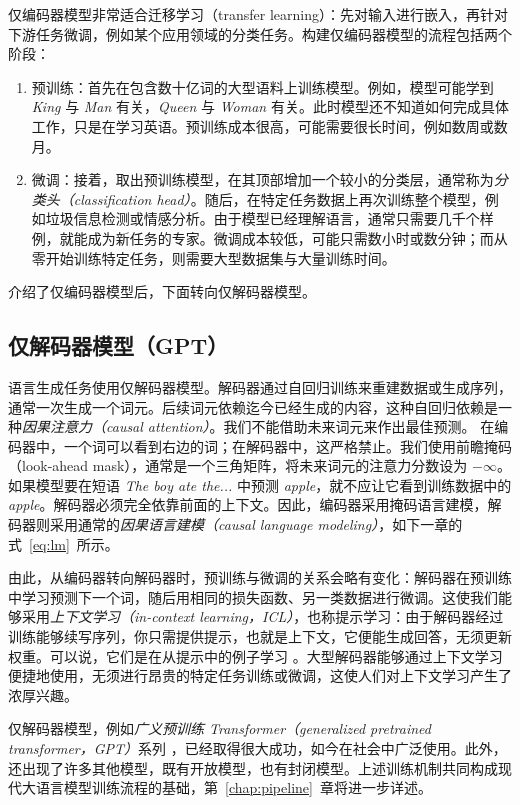 仅编码器模型非常适合迁移学习（transfer learning）：先对输入进行嵌入，再针对下游任务微调，例如某个应用领域的分类任务。构建仅编码器模型的流程包括两个阶段：
\begin{enumerate}
    \item 预训练：首先在包含数十亿词的大型语料上训练模型。例如，模型可能学到 \textit{King} 与 \textit{Man} 有关，\textit{Queen} 与 \textit{Woman} 有关。此时模型还不知道如何完成具体工作，只是在学习英语。预训练成本很高，可能需要很长时间，例如数周或数月。
    \item 微调：接着，取出预训练模型，在其顶部增加一个较小的分类层，通常称为\textit{分类头（classification head）}。随后，在特定任务数据上再次训练整个模型，例如垃圾信息检测或情感分析。由于模型已经理解语言，通常只需要几千个样例，就能成为新任务的专家。微调成本较低，可能只需数小时或数分钟；而从零开始训练特定任务，则需要大型数据集与大量训练时间。
\end{enumerate}
介绍了仅编码器模型后，下面转向仅解码器模型。

\subsection{仅解码器模型（GPT）}
语言生成任务使用仅解码器模型。解码器通过自回归训练来重建数据或生成序列，通常一次生成一个词元。后续词元依赖迄今已经生成的内容，这种自回归依赖是一种\textit{因果注意力（causal attention）}。我们不能借助未来词元来作出最佳预测。
在编码器中，一个词可以看到右边的词；在解码器中，这严格禁止。我们使用前瞻掩码（look-ahead mask），通常是一个三角矩阵，将未来词元的注意力分数设为 $-\infty$。如果模型要在短语 \textit{The boy ate the...} 中预测 \textit{apple}，就不应让它看到训练数据中的 \textit{apple}。解码器必须完全依靠前面的上下文。因此，编码器采用掩码语言建模，解码器则采用通常的\textit{因果语言建模（causal language modeling）}，如下一章的式~\ref{eq:lm}~所示。

由此，从编码器转向解码器时，预训练与微调的关系会略有变化：解码器在预训练中学习预测下一个词，随后用相同的损失函数、另一类数据进行微调。这使我们能够采用{\em 上下文学习（in-context learning，ICL）}，也称提示学习：由于解码器经过训练能够续写序列，你只需提供提示，也就是上下文，它便能生成回答，无须更新权重。可以说，它们是在从提示中的例子学习 \citep{brown2020language}。大型解码器能够通过上下文学习便捷地使用，无须进行昂贵的特定任务训练或微调，这使人们对上下文学习产生了浓厚兴趣。

仅解码器模型，例如{\em 广义预训练 Transformer（generalized pretrained transformer，GPT）}系列 \citep{radford2018improving,radford2019language,brown2020language,ouyang2022training,achiam2023gpt}，已经取得很大成功，如今在社会中广泛使用。此外，还出现了许多其他模型，既有开放模型，也有封闭模型。上述训练机制共同构成现代大语言模型训练流程的基础，第~\ref{chap:pipeline}~章将进一步详述。

